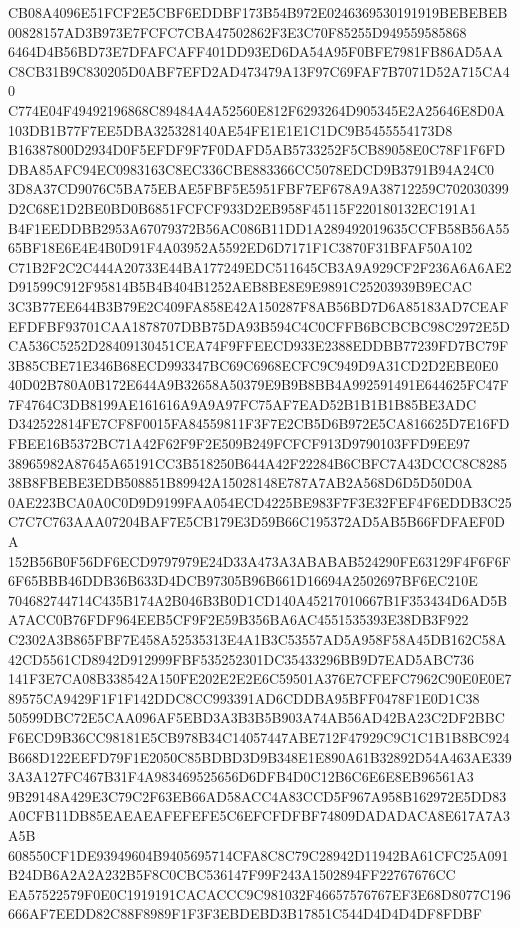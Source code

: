 \documentclass[UTF8,fontset=fandol,zihao=-4,a4paper]{ctexart}
\begin{document}
{{CB08A4096E51FCF2E5CBF6EDDBF173B54B972E0246369530191919BEBEBEB00828157AD3B973E7FCFC7CBA47502862F3E3C70F85255D949559585868
6464D4B56BD73E7DFAFCAFF401DD93ED6DA54A95F0BFE7981FB86AD5AAC8CB31B9C830205D0ABF7EFD2AD473479A13F97C69FAF7B7071D52A715CA40
C774E04F49492196868C89484A4A52560E812F6293264D905345E2A25646E8D0A103DB1B77F7EE5DBA325328140AE54FE1E1E1C1DC9B5455554173D8
B16387800D2934D0F5EFDF9F7F0DAFD5AB5733252F5CB89058E0C78F1F6FDDBA85AFC94EC0983163C8EC336CBE883366CC5078EDCD9B3791B94A24C0
3D8A37CD9076C5BA75EBAE5FBF5E5951FBF7EF678A9A38712259C702030399D2C68E1D2BE0BD0B6851FCFCF933D2EB958F45115F220180132EC191A1
B4F1EEDDBB2953A67079372B56AC086B11DD1A289492019635CCFB58B56A5565BF18E6E4E4B0D91F4A03952A5592ED6D7171F1C3870F31BFAF50A102
C71B2F2C2C444A20733E44BA177249EDC511645CB3A9A929CF2F236A6A6AE2D91599C912F95814B5B4B404B1252AEB8BE8E9E9891C25203939B9ECAC
3C3B77EE644B3B79E2C409FA858E42A150287F8AB56BD7D6A85183AD7CEAFEFDFBF93701CAA1878707DBB75DA93B594C4C0CFFB6BCBCBC98C2972E5D
CA536C5252D28409130451CEA74F9FFEECD933E2388EDDBB77239FD7BC79F3B85CBE71E346B68ECD993347BC69C6968ECFC9C949D9A31CD2D2EBE0E0
40D02B780A0B172E644A9B32658A50379E9B9B8BB4A992591491E644625FC47F7F4764C3DB8199AE161616A9A9A97FC75AF7EAD52B1B1B1B85BE3ADC
D342522814FE7CF8F0015FA84559811F3F7E2CB5D6B972E5CA816625D7E16FDFBEE16B5372BC71A42F62F9F2E509B249FCFCF913D9790103FFD9EE97
38965982A87645A65191CC3B518250B644A42F22284B6CBFC7A43DCCC8C828538B8FBEBE3EDB508851B89942A15028148E787A7AB2A568D6D5D50D0A
0AE223BCA0A0C0D9D9199FAA054ECD4225BE983F7F3E32FEF4F6EDDB3C25C7C7C763AAA07204BAF7E5CB179E3D59B66C195372AD5AB5B66FDFAEF0DA
152B56B0F56DF6ECD9797979E24D33A473A3ABABAB524290FE63129F4F6F6F6F65BBB46DDB36B633D4DCB97305B96B661D16694A2502697BF6EC210E
704682744714C435B174A2B046B3B0D1CD140A45217010667B1F353434D6AD5BA7ACC0B76FDF964EEB5CF9F2E59B356BA6AC4551535393E38DB3F922
C2302A3B865FBF7E458A52535313E4A1B3C53557AD5A958F58A45DB162C58A42CD5561CD8942D912999FBF535252301DC35433296BB9D7EAD5ABC736
141F3E7CA08B338542A150FE202E2E2E6C59501A376E7CFEFC7962C90E0E0E789575CA9429F1F1F142DDC8CC993391AD6CDDBA95BFF0478F1E0D1C38
50599DBC72E5CAA096AF5EBD3A3B3B5B903A74AB56AD42BA23C2DF2BBCF6ECD9B36CC98181E5CB978B34C14057447ABE712F47929C9C1C1B1B8BC924
B668D122EEFD79F1E2050C85BDBD3D9B348E1E890A61B32892D54A463AE3393A3A127FC467B31F4A983469525656D6DFB4D0C12B6C6E6E8EB96561A3
9B29148A429E3C79C2F63EB66AD58ACC4A83CCD5F967A958B162972E5DD83A0CFB11DB85EAEAEAFEFEFE5C6EFCFDFBF74809DADADACA8E617A7A3A5B
608550CF1DE93949604B9405695714CFA8C8C79C28942D11942BA61CFC25A091B24DB6A2A2A232B5F8C0CBC536147F99F243A1502894FF22767676CC
EA57522579F0E0C1919191CACACCC9C981032F46657576767EF3E68D8077C196666AF7EEDD82C88F8989F1F3F3EBDEBD3B17851C544D4D4D4DF8FDBF
}}
\end{document}
